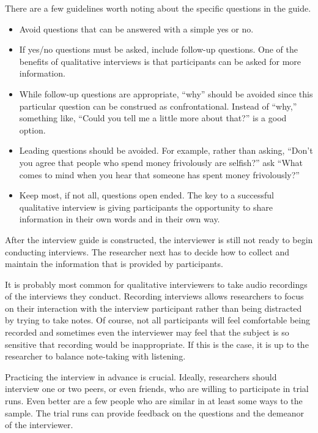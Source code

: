 There are a few guidelines worth noting about the specific questions in the guide.

\begin{itemize}
	\item Avoid questions that can be answered with a simple yes or no. 
	\item If yes/no questions must be asked, include follow-up questions. One of the benefits of qualitative interviews is that participants can be asked for more information.
	\item While follow-up questions are appropriate, ``why'' should be avoided since this particular question can be construed as confrontational. Instead of ``why,'' something like, ``Could you tell me a little more about that?'' is a good option.
	\item Leading questions should be avoided. For example, rather than asking, ``Don't you agree that people who spend money frivolously are selfish?'' ask ``What comes to mind when you hear that someone has spent money frivolously?''
	\item Keep most, if not all, questions open ended. The key to a successful qualitative interview is giving participants the opportunity to share information in their own words and in their own way.
\end{itemize}

After the interview guide is constructed, the interviewer is still not ready to begin conducting interviews. The researcher next has to decide how to collect and maintain the information that is provided by participants. 

It is probably most common for qualitative interviewers to take audio recordings of the interviews they conduct. Recording interviews allows researchers to focus on their interaction with the interview participant rather than being distracted by trying to take notes. Of course, not all participants will feel comfortable being recorded and sometimes even the interviewer may feel that the subject is so sensitive that recording would be inappropriate. If this is the case, it is up to the researcher to balance note-taking with listening. 

Practicing the interview in advance is crucial. Ideally, researchers should interview one or two peers, or even friends, who are willing to participate in trial runs. Even better are a few people who are similar in at least some ways to the sample. The trial runs can provide feedback on the questions and the demeanor of the interviewer.

